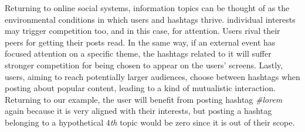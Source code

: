 Returning to online social systems, information topics can be thought of as the environmental conditions in which users and hashtags thrive. individual interests may trigger competition too, and in this case, for attention. Users rival their peers for getting their posts read. In the same way, if an external event has focused attention on a specific theme, the hashtags related to it will suffer stronger competition for being chosen to appear on the users' screens. Lastly, users, aiming to reach potentially larger audiences, choose between hashtags when posting about popular content, leading to a kind of mutualistic interaction. Returning to our example, the user will benefit from posting hashtag \textit{\#lorem} again because it is very aligned with their interests, but posting a hashtag belonging to a hypothetical $4$\textit{th} topic would be zero since it is out of their scope. \\

